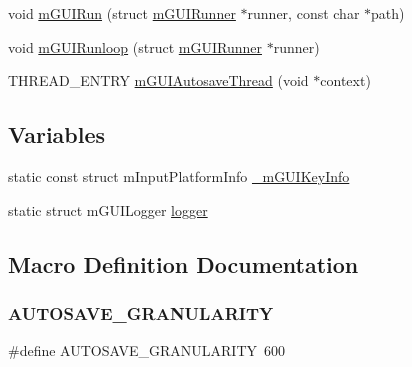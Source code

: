 \begin{DoxyCompactItemize}
\item 
void \mbox{\hyperlink{gui-runner_8c_a1285400b234548c4116a1965de5449eb}{m\+G\+U\+I\+Run}} (struct \mbox{\hyperlink{structm_g_u_i_runner}{m\+G\+U\+I\+Runner}} $\ast$runner, const char $\ast$path)
\item 
void \mbox{\hyperlink{gui-runner_8c_a18b60d93179a62db9bb8c6b0fde56138}{m\+G\+U\+I\+Runloop}} (struct \mbox{\hyperlink{structm_g_u_i_runner}{m\+G\+U\+I\+Runner}} $\ast$runner)
\item 
T\+H\+R\+E\+A\+D\+\_\+\+E\+N\+T\+RY \mbox{\hyperlink{gui-runner_8c_a893aeb86364bda67a415a000c4a690d6}{m\+G\+U\+I\+Autosave\+Thread}} (void $\ast$context)
\end{DoxyCompactItemize}
\subsection*{Variables}
\begin{DoxyCompactItemize}
\item 
static const struct m\+Input\+Platform\+Info \mbox{\hyperlink{gui-runner_8c_af007800b38f7fea135f6a6d41bd603e9}{\+\_\+m\+G\+U\+I\+Key\+Info}}
\item 
static struct m\+G\+U\+I\+Logger \mbox{\hyperlink{gui-runner_8c_a4b3171e336aa70bc7c85830e85ac6d3e}{logger}}
\end{DoxyCompactItemize}


\subsection{Macro Definition Documentation}
\mbox{\label{gui-runner_8c_a9257e65a77150da52aba4237ec2766c1}} 
\subsubsection{\texorpdfstring{A\+U\+T\+O\+S\+A\+V\+E\+\_\+\+G\+R\+A\+N\+U\+L\+A\+R\+I\+TY}{AUTOSAVE\_GRANULARITY}}
{\footnotesize\ttfamily \#define A\+U\+T\+O\+S\+A\+V\+E\+\_\+\+G\+R\+A\+N\+U\+L\+A\+R\+I\+TY~600}

\mbox{\label{gui-runner_8c_aa6b0c6cee2d1a3845fed773b77b872a1}} 

